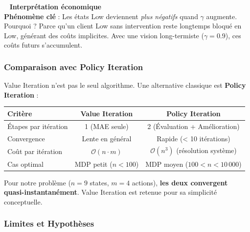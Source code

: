 \documentclass[11pt,a4paper]{article}
\newenvironment{insightbox}{%
  \vspace{3pt}\begin{framed}
  \noindent{\color{NavyBlue}\rule{0.3cm}{3pt}}~%
  \textcolor{NavyBlue}{\textbf{Interprétation économique}}\\[3pt]}
  {\end{framed}\vspace{3pt}}
\begin{document}
\begin{insightbox}
\textbf{Phénomène clé} : Les états Low deviennent \textit{plus négatifs} quand $\gamma$ augmente. Pourquoi ? Parce qu'un client Low sans intervention reste longtemps bloqué en Low, générant des coûts implicites. Avec une vision long-termiste ($\gamma = 0.9$), ces coûts futurs s'accumulent.
\end{insightbox}




\subsubsection{Comparaison avec Policy Iteration}

Value Iteration n'est pas le seul algorithme. Une alternative classique est \textbf{Policy Iteration} :

\begin{center}
\begin{tabularx}{\linewidth}{|l|c|c|}
\hline
\textbf{Critère} & \textbf{Value Iteration} & \textbf{Policy Iteration} \\
\hline
Étapes par itération & 1 (MAE seule) & 2 (Évaluation + Amélioration) \\
Convergence & Lente en général & Rapide (< 10 itérations) \\
Coût par itération & $\mathcal{O}(n \cdot m)$ & $\mathcal{O}(n^3)$ (résolution système) \\
Cas optimal & MDP petit ($n < 100$) & MDP moyen ($100 < n < 10\,000$) \\
\hline
\end{tabularx}
\end{center}

Pour notre problème ($n = 9$ states, $m = 4$ actions), \textbf{les deux convergent quasi-instantanément}. Value Iteration est retenue pour sa simplicité conceptuelle.

\subsubsection{Limites et Hypothèses}
\end{document}
